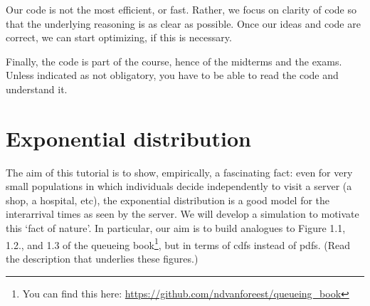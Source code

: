 \documentclass{scrartcl}
\begin{document}
Our code is not the most efficient, or fast.
Rather, we focus on clarity of code so that the underlying reasoning is as clear as possible.
Once our ideas and code are correct, we can start optimizing, if this is necessary.

Finally, the code is part of the course, hence of the midterms and the exams.
Unless indicated as not obligatory, you have to be able to read the code and understand it.


\clearpage
\section{Exponential distribution}

The aim of this tutorial is to show, empirically, a fascinating fact: even for very small populations in which individuals decide independently to visit a server (a shop, a hospital, etc), the exponential distribution is a good model for the interarrival times as seen by the server.
We will develop a simulation to motivate this `fact of nature'.
In particular, our aim is to build analogues to Figure 1.1, 1.2., and 1.3 of the queueing book\footnote{You can find this here: \url{https://github.com/ndvanforeest/queueing_book}}, but in terms of cdfs instead of pdfs.
(Read the description that underlies these figures.)
\end{document}
